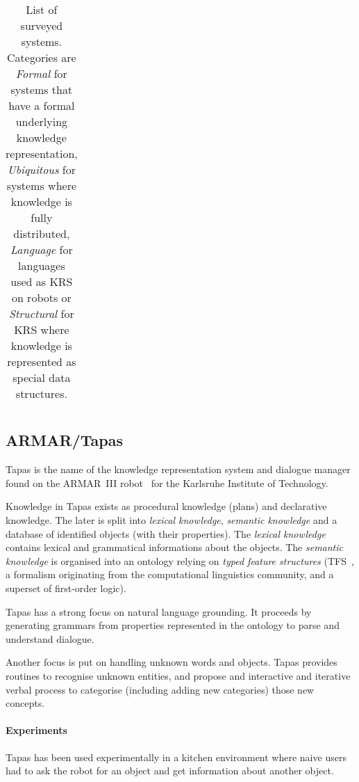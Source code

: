 \documentclass[journal]{IEEEtran}
\begin{document}
\begin{table*}
\begin{center}
\begin{tabular}{p{2.2cm}p{1.6cm}p{4cm}p{2.4cm}p{3.4cm}p{1.5cm}}
\bottomrule

\end{tabular}
\end{center}

\caption{List of surveyed systems. Categories are \emph{Formal} for systems
that have a formal underlying knowledge representation, \emph{Ubiquitous} for
systems where knowledge is fully distributed, \emph{Language} for languages
used as KRS on robots or \emph{Structural} for KRS where knowledge is
represented as special data structures.}

\label{table|surveyed-systems}
\end{table*}


\subsection{ARMAR/Tapas}

{\sc Tapas} is the name of the knowledge representation system and dialogue
manager found on the ARMAR~III robot~\cite{Holzapfel2008} for the Karlsruhe
Institute of Technology.

Knowledge in {\sc Tapas} exists as procedural knowledge (plans) and declarative
knowledge. The later is split into \emph{lexical knowledge}, \emph{semantic
knowledge} and a database of identified objects (with their properties). The
\emph{lexical knowledge} contains lexical and grammatical informations about
the objects. The \emph{semantic knowledge} is organised into an ontology
relying on \emph{typed feature structures} (TFS~\cite{Carpenter1992}, a
formalism originating from the computational linguistics community, and a
superset of first-order logic).

{\sc Tapas} has a strong focus on natural language grounding. It proceeds by
generating grammars from properties represented in the ontology to parse and
understand dialogue.

Another focus is put on handling unknown words and objects. {\sc Tapas}
provides routines to recognise unknown entities, and propose and interactive
and iterative verbal process to categorise (including adding new categories)
those new concepts.

\paragraph{Experiments} {\sc Tapas} has been used experimentally in a kitchen
environment where naive users had to ask the robot for an object and get
information about another object.
\end{document}
